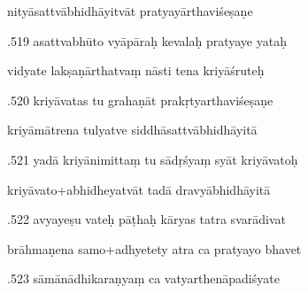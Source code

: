 \documentclass[article,12pt,a4paper]{memoir}%
\newcounter{parCount}
\begin{document}
	  
	  \pstart \leavevmode%
	nityāsattvābhidhāyitvāt pratyayārthaviśeṣaṇe 
	{}
	\pend%
      

	  
	  \pstart {}.519 asattvabhūto vyāpāraḥ kevalaḥ pratyaye yataḥ 
	{}
	\pend%
      

	  
	  \pstart \leavevmode%
	vidyate lakṣaṇārthatvaṃ nāsti tena kriyāśruteḥ 
	{}
	\pend%
      

	  
	  \pstart {}.520 kriyāvatas tu grahaṇāt   prakṛtyarthaviśeṣaṇe 
	{}
	\pend%
      

	  
	  \pstart \leavevmode%
	kriyāmātrena tulyatve siddhāsattvābhidhāyitā 
	{}
	\pend%
      

	  
	  \pstart {}.521 yadā kriyānimittaṃ tu sādṛśyaṃ syāt kriyāvatoḥ 
	{}
	\pend%
      

	  
	  \pstart \leavevmode%
	kriyāvato+abhidheyatvāt tadā dravyābhidhāyitā 
	{}
	\pend%
      

	  
	  \pstart {}.522 avyayeṣu vateḥ pāṭhaḥ kāryas tatra svarādivat 
	{}
	\pend%
      

	  
	  \pstart \leavevmode%
	brāhmaṇena samo+adhyetety atra ca pratyayo bhavet 
	{}
	\pend%
      

	  
	  \pstart {}.523 sāmānādhikaraṇyaṃ ca vatyarthenāpadiśyate 
	{}
	\pend%
      
\end{document}
